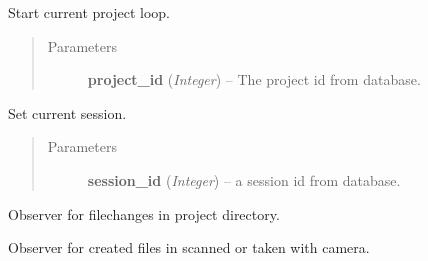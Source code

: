 \documentclass[letterpaper,10pt,english]{sphinxmanual}
\begin{document}
\begin{fulllineitems}
\begin{fulllineitems}
\end{fulllineitems}


\begin{fulllineitems}
\label{wos:wos.GUI.SetCurrentProject}
Start current project loop.
\begin{quote}\begin{description}
\item[{Parameters}] \leavevmode
\textbf{project\_id} (\emph{Integer}) -- The project id from database.

\end{description}\end{quote}

\end{fulllineitems}


\begin{fulllineitems}
\label{wos:wos.GUI.SetCurrentSession}
Set current session.
\begin{quote}\begin{description}
\item[{Parameters}] \leavevmode
\textbf{session\_id} (\emph{Integer}) -- a session id from database.

\end{description}\end{quote}

\end{fulllineitems}


\begin{fulllineitems}
\label{wos:wos.GUI.SetProjectObserver}
Observer for filechanges in project directory.

\end{fulllineitems}


\begin{fulllineitems}
\label{wos:wos.GUI.SetScanObserver}
Observer for created files in scanned or taken with camera.

\end{fulllineitems}


\end{fulllineitems}
\end{document}
